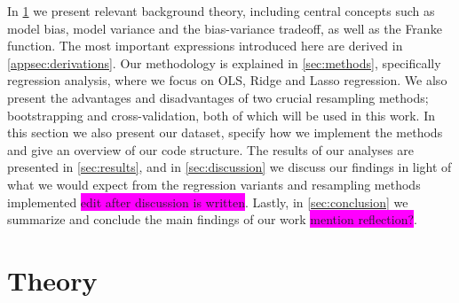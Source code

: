 \documentclass[aps,pra,english,notitlepage,reprint,nofootinbib]{revtex4-1}  %
\begin{document}
In \cref{sec:theory} we present relevant background theory, including central concepts such as model bias, model variance and the bias-variance tradeoff, as well as the Franke function. The most important expressions introduced here are derived in \cref{appsec:derivations}. Our methodology is explained in \cref{sec:methods}, specifically regression analysis, where we focus on OLS, Ridge and Lasso regression. We also present the advantages and disadvantages of two crucial resampling methods; bootstrapping and cross-validation, both of which will be used in this work. In this section we also present our dataset, specify how we implement the methods and give an overview of our code structure. The results of our analyses are presented in \cref{sec:results}, and in \cref{sec:discussion} we discuss our findings in light of what we would expect from the regression variants and resampling methods implemented \colorbox{magenta}{edit after discussion is written}. Lastly, in \cref{sec:conclusion} we summarize and conclude the main findings of our work \colorbox{magenta}{mention reflection?}. 

\section{Theory}\label{sec:theory}


\end{document}
